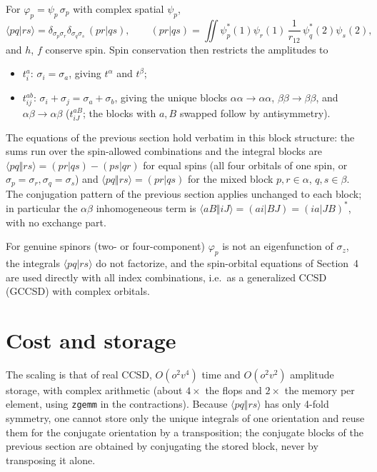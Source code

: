\documentclass[11pt]{article}
\newcommand{\anti}[4]{\langle #1#2\Vert #3#4\rangle}
\newcommand{\dir}[4]{\langle #1#2|#3#4\rangle}
\begin{document}
For $\varphi_p=\psi_p\,\sigma_p$ with complex spatial $\psi_p$,
\begin{equation}
\dir{p}{q}{r}{s}=\delta_{\sigma_p\sigma_r}\delta_{\sigma_q\sigma_s}\,
(pr|qs),\qquad
(pr|qs)=\iint\psi_p^*(1)\psi_r(1)\,\frac1{r_{12}}\,\psi_q^*(2)\psi_s(2),
\end{equation}
and $h$, $f$ conserve spin. Spin conservation then restricts the amplitudes
to
\begin{itemize}
\item $t_i^a$: $\sigma_i=\sigma_a$, giving $t^{\alpha}$ and $t^{\beta}$;
\item $t_{ij}^{ab}$: $\sigma_i+\sigma_j=\sigma_a+\sigma_b$, giving the
      unique blocks $\alpha\alpha\to\alpha\alpha$, $\beta\beta\to\beta\beta$,
      and $\alpha\beta\to\alpha\beta$ ($t_{iJ}^{aB}$; the blocks with $a,B$
      swapped follow by antisymmetry).
\end{itemize}
The equations of the previous section hold verbatim in this block structure:
the sums run over the spin-allowed combinations and the integral blocks are
$\anti{p}{q}{r}{s}=(pr|qs)-(ps|qr)$ for equal spins (all four orbitals of one spin, or
$\sigma_p=\sigma_r,\sigma_q=\sigma_s$) and $\anti{p}{q}{r}{s}=(pr|qs)$ for the
mixed block $p,r\in\alpha$, $q,s\in\beta$. The conjugation pattern of the
previous section applies unchanged to each block; in particular the
$\alpha\beta$ inhomogeneous term is
$\anti{a}{B}{i}{J}=(ai|BJ)=(ia|JB)^*$, with no exchange part.

For genuine spinors (two- or four-component) $\varphi_p$ is not an eigenfunction
of $\sigma_z$, the integrals $\dir{p}{q}{r}{s}$ do not factorize, and the
spin-orbital equations of Section~4 are used directly with all index
combinations, i.e.\ as a generalized CCSD (GCCSD) with complex orbitals.

\section{Cost and storage}

The scaling is that of real CCSD, $O(o^2v^4)$ time and $O(o^2v^2)$ amplitude
storage, with complex arithmetic (about $4\times$ the flops and $2\times$ the
memory per element, using \texttt{zgemm} in the contractions). Because
$\anti{p}{q}{r}{s}$ has only 4-fold symmetry, one cannot store only the unique
integrals of one orientation and reuse them for the conjugate orientation by
a transposition; the conjugate blocks of the previous section are obtained
by conjugating the stored block, never by transposing it alone.
\end{document}
